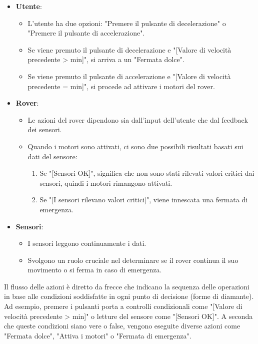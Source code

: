\documentclass{article}
\begin{document}
        \begin{itemize}
          \item \textbf{Utente}:
              \begin{itemize}
              \item L'utente ha due opzioni: "Premere il pulsante di decelerazione" o "Premere il pulsante di accelerazione".
              \item Se viene premuto il pulsante di decelerazione e "[Valore di velocità precedente > min]", si arriva a un "Fermata dolce".
              \item Se viene premuto il pulsante di accelerazione e "[Valore di velocità precedente = min]", si procede ad attivare i motori del rover.
              \end{itemize}
          \item \textbf{Rover}:
              \begin{itemize}
              \item Le azioni del rover dipendono sia dall'input dell'utente che dal feedback dei sensori.
              \item Quando i motori sono attivati, ci sono due possibili risultati basati sui dati del sensore: 
                  \begin{enumerate}
                  \item Se "[Sensori OK]", significa che non sono stati rilevati valori critici dai sensori, quindi i motori rimangono attivati.
                  \item Se "[I sensori rilevano valori critici]", viene innescata una fermata di emergenza.
                  \end{enumerate}
              \end{itemize}
          \item \textbf{Sensori}:
              \begin{itemize}
              \item I sensori leggono continuamente i dati.
              \item Svolgono un ruolo cruciale nel determinare se il rover continua il suo movimento o si ferma in caso di emergenza.
              \end{itemize}
          \end{itemize}
          
        Il flusso delle azioni è diretto da frecce che indicano la sequenza delle operazioni in base alle condizioni soddisfatte in ogni punto di decisione (forme di diamante). Ad esempio, premere i pulsanti porta a controlli condizionali come "[Valore di velocità precedente > min]" o letture del sensore come "[Sensori OK]". A seconda che queste condizioni siano vere o false, vengono eseguite diverse azioni come "Fermata dolce", "Attiva i motori" o "Fermata di emergenza".
\end{document}

